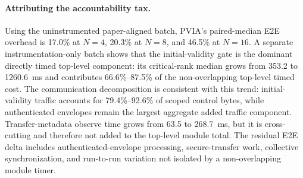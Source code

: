 \paragraph{Attributing the accountability tax.} Using the uninstrumented paper-aligned batch, PVIA's paired-median E2E overhead is 17.0\% at $N=4$, 20.3\% at $N=8$, and 46.5\% at $N=16$. A separate instrumentation-only batch shows that the initial-validity gate is the dominant directly timed top-level component: its critical-rank median grows from 353.2 to 1260.6~ms and contributes 66.6\%--87.5\% of the non-overlapping top-level timed cost. The communication decomposition is consistent with this trend: initial-validity traffic accounts for 79.4\%--92.6\% of scoped control bytes, while authenticated envelopes remain the largest aggregate added traffic component. Transfer-metadata observe time grows from 63.5 to 268.7~ms, but it is cross-cutting and therefore not added to the top-level module total. The residual E2E delta includes authenticated-envelope processing, secure-transfer work, collective synchronization, and run-to-run variation not isolated by a non-overlapping module timer.
